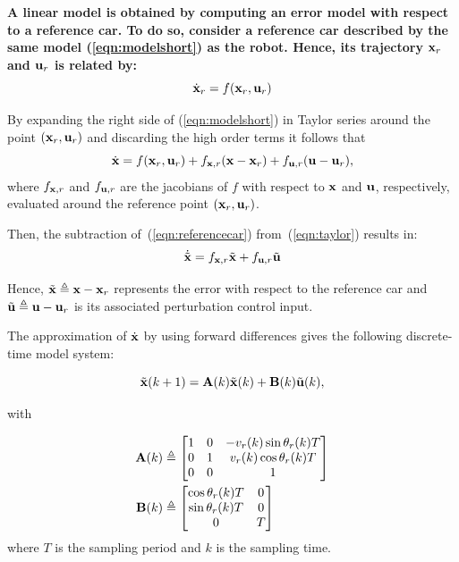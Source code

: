 \documentclass[conference]{IEEEtran} %
\begin{document}
{\bf A linear model is obtained by computing an error model with respect to a reference car. To do so, consider a reference car described by the same model (\ref{eqn:modelshort}) as the robot. Hence, its trajectory ${\bf x}_r$ and ${\bf u}_r$ is related by:
\begin{equation}
	\dot{\bf x}_r=f({\bf x}_r,{\bf u}_r)
\label{eqn:referencecar}
\end{equation}

By expanding the right side of (\ref{eqn:modelshort}) in Taylor series around the point $({\bf x}_r,{\bf u}_r)$ and discarding the high order terms it follows that
\begin{equation}
\label{eqn:taylor}
	\dot{\bf x} = f({\bf x}_r,{\bf u}_r) + f_{{\bf x},r}({\bf x}-{\bf x}_r) + f_{{\bf u},r}({\bf u}-{\bf u}_r),
\end{equation}
where $f_{{\bf x},r}$ and $f_{{\bf u},r}$ are the jacobians of $f$ with respect to ${\bf x}$ and ${\bf u}$, respectively, evaluated around the reference point $({\bf x}_r,{\bf u}_r)$.

Then, the subtraction of~(\ref{eqn:referencecar}) from~(\ref{eqn:taylor}) results in:
\begin{equation}
\label{eqn:conterror}
	{\dot{\tilde{\bf x}}} = f_{{\bf x},r}\tilde{\bf x}+f_{{\bf u},r}\tilde{\bf u}
\end{equation}

Hence, $\tilde{\bf x}\triangleq{\bf x}-{\bf x}_r$ represents the
error with respect to the reference car and $\tilde{\bf u}\triangleq
{\bf u}-{\bf u}_r$ is its associated perturbation control input.

The approximation of $\dot{\bf x}$ by using forward differences gives the following discrete-time model system:

\begin{equation}
\label{eqn:error}
	\tilde{\bf x}(k+1) = {\bf A}(k)\tilde{\bf x}(k)+{\bf B}(k)\tilde{\bf u}(k),
\end{equation}

\noindent with

\begin{align*}
	{\bf A}(k) &\triangleq \begin{bmatrix}
		1 & 0 & -v_r(k)\sin\theta_r(k)T \\
		0 & 1 &  v_r(k)\cos\theta_r(k)T \\
		0 & 0 & 1
	\end{bmatrix} \\
	{\bf B}(k) &\triangleq \begin{bmatrix}
		\cos\theta_r(k)T & 0 \\
		\sin\theta_r(k)T & 0 \\
		0 			  & T
	\end{bmatrix}
\end{align*}
where $T$ is the sampling period and $k$ is the sampling time. }
\end{document}
